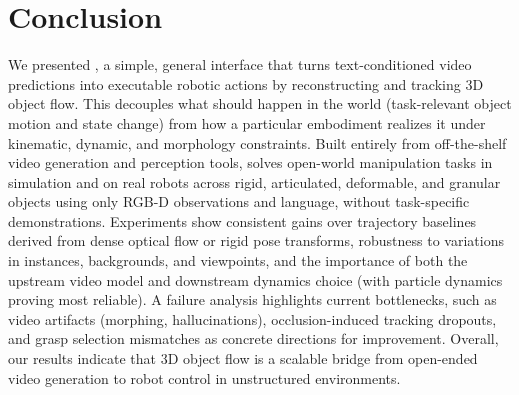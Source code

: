 \section{Conclusion}
We presented \algo, a simple, general interface that turns text-conditioned video predictions into executable robotic actions by reconstructing and tracking 3D object flow. This decouples what should happen in the world (task-relevant object motion and state change) from how a particular embodiment realizes it under kinematic, dynamic, and morphology constraints. Built entirely from off-the-shelf video generation and perception tools, \algo solves open-world manipulation tasks in simulation and on real robots across rigid, articulated, deformable, and granular objects using only RGB-D observations and language, without task-specific demonstrations. Experiments show consistent gains over trajectory baselines derived from dense optical flow or rigid pose transforms, robustness to variations in instances, backgrounds, and viewpoints, and the importance of both the upstream video model and downstream dynamics choice (with particle dynamics proving most reliable). A failure analysis highlights current bottlenecks, such as video artifacts (morphing, hallucinations), occlusion-induced tracking dropouts, and grasp selection mismatches as concrete directions for improvement.  Overall, our results indicate that 3D object flow is a scalable bridge from open-ended video generation to robot control in unstructured environments.

